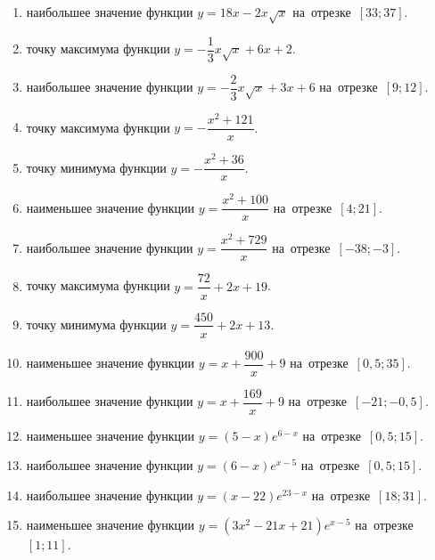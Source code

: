 \documentclass[a4paper,10pt]{article}
\begin{document}
\begin{enumerate}
\item {} наибольшее значение функции $y=18x -2x\sqrt{x}$ на~отрезке~$\left[33;37\right]$.

\item {} точку максимума функции $y=-\dfrac{1}{3}x\sqrt{x} +6x+2$.

\item {} наибольшее значение функции $y=-\dfrac{2}{3}x\sqrt{x} +3x+6$ на~отрезке~$\left[9;12\right]$.

\item {} точку максимума функции $y=-\dfrac{x^2 +121}{x}$.

\item {} точку минимума функции $y=-\dfrac{x^2 +36}{x}$.

\item {} наименьшее значение функции $y=\dfrac{x^2 +100}{x}$ на~отрезке~$\left[4;21\right]$.

\item {} наибольшее значение функции $y=\dfrac{x^2 +729}{x}$ на~отрезке~$\left[-38;-3\right]$.

\item {} точку максимума функции $y=\dfrac{72}{x} +2x+19$.

\item {} точку минимума функции $y=\dfrac{450}{x} +2x+13$.

\item {} наименьшее значение функции $y=x+\dfrac{900}{x} +9$ на~отрезке~$\left[0,5;35\right]$.

\item {} наибольшее значение функции $y=x+\dfrac{169}{x} +9$ на~отрезке~$\left[-21;-0,5\right]$.

\item {} наименьшее значение функции $y=\left(5-x\right)e^{6-x}$ на~отрезке~$\left[0,5;15\right]$.

\item {} наибольшее значение функции $y=\left(6-x\right)e^{x-5}$ на~отрезке~$\left[0,5;15\right]$.

\item {} наибольшее значение функции $y=\left(x-22\right)e^{23-x}$ на~отрезке~$\left[18;31\right]$.

\item {} наименьшее значение функции $y=\left(3x^2 -21x +21\right)e^{x -5}$ на~отрезке~$\left[1;11\right]$.


\end{enumerate}
\end{document}
